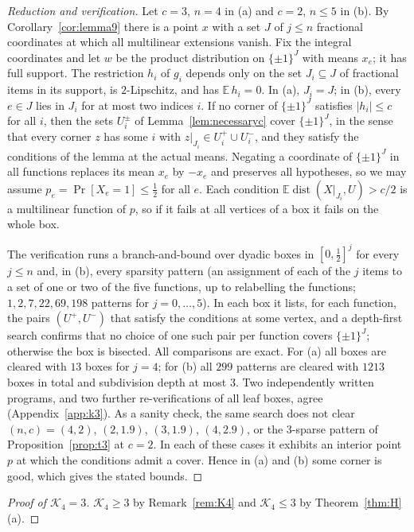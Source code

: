 \documentclass[11pt,letterpaper]{article}
\theoremstyle{definition}
\newcommand{\E}{\mathbb{E}}
\newcommand{\cube}[1]{\{\pm1\}^{#1}}
\DeclareMathOperator{\dist}{dist}
\begin{document}
\begin{proof}[Reduction and verification]
Let $c=3$, $n=4$ in (a) and $c=2$, $n\le5$ in (b). By Corollary~\ref{cor:lemma9} there is a point
$x$ with a set $J$ of $j\le n$ fractional coordinates at which all multilinear extensions vanish.
Fix the integral coordinates and let $w$ be the product distribution on $\cube J$ with means $x_e$;
it has full support. The restriction $h_i$ of $g_i$ depends only on the set $J_i\subseteq J$ of
fractional items in its support, is $2$-Lipschitz, and has $\E\,h_i=0$. In (a), $J_i=J$; in (b),
every $e\in J$ lies in $J_i$ for at most two indices $i$. If no corner of $\cube J$ satisfies
$|h_i|\le c$ for all $i$, then the sets $U_i^\pm$ of Lemma~\ref{lem:necessaryc} cover $\cube J$, in
the sense that every corner $z$ has some $i$ with $z|_{J_i}\in U_i^+\cup U_i^-$, and they satisfy
the conditions of the lemma at the actual means. Negating a coordinate of $\cube J$ in all functions
replaces its mean $x_e$ by $-x_e$ and preserves all hypotheses, so we may assume
$p_e=\Pr[X_e=1]\le\frac12$ for all $e$. Each condition $\E\dist(X|_{J_i},U)>c/2$ is a multilinear
function of $p$, so if it fails at all vertices of a box it fails on the whole box.

The verification runs a branch-and-bound over dyadic boxes in $[0,\frac12]^j$ for every $j\le n$
and, in (b), every sparsity pattern (an assignment of each of the $j$ items to a set of one or two of
the five functions, up to relabelling the functions; $1,2,7,22,69,198$ patterns for
$j=0,\dots,5$). In each box it lists, for each function, the pairs $(U^+,U^-)$ that satisfy the
conditions at some vertex, and a depth-first search confirms that no choice of one such pair per
function covers $\cube J$; otherwise the box is bisected. All comparisons are exact. For (a) all
boxes are cleared with $13$ boxes for $j=4$; for (b) all $299$ patterns are cleared with $1213$ boxes
in total and subdivision depth at most $3$. Two independently written programs, and two further
re-verifications of all leaf boxes, agree (Appendix~\ref{app:k3}). As a sanity check, the same
search does not clear $(n,c)=(4,2)$, $(2,1.9)$, $(3,1.9)$, $(4,2.9)$, or the $3$-sparse pattern of
Proposition~\ref{prop:t3} at $c=2$. In each of these cases it exhibits an interior point $p$ at which
the conditions admit a cover. Hence in (a) and (b) some corner is good, which gives the stated
bounds.
\end{proof}

\begin{proof}[Proof of $\mathcal{K}_4=3$]
$\mathcal{K}_4\ge3$ by Remark~\ref{rem:K4} and $\mathcal{K}_4\le3$ by Theorem~\ref{thm:H}(a).
\end{proof}
\end{document}
